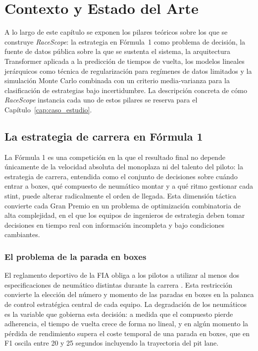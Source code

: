 
\chapter{Contexto y Estado del Arte}
\label{cap:estado_arte}

A lo largo de este capítulo se exponen los pilares teóricos sobre los que se construye \textit{RaceScope}: la estrategia en Fórmula~1 como problema de decisión, la fuente de datos pública sobre la que se sustenta el sistema, la arquitectura Transformer aplicada a la predicción de tiempos de vuelta, los modelos lineales jerárquicos como técnica de regularización para regímenes de datos limitados y la simulación Monte Carlo combinada con un criterio media-varianza para la clasificación de estrategias bajo incertidumbre. La descripción concreta de cómo \textit{RaceScope} instancia cada uno de estos pilares se reserva para el Capítulo~\ref{cap:caso_estudio}.

\section{La estrategia de carrera en Fórmula 1}
\label{sec:estrategia_f1}

La Fórmula 1 es una competición en la que el resultado final no depende únicamente de la velocidad absoluta del monoplaza ni del talento del piloto: la estrategia de carrera, entendida como el conjunto de decisiones sobre cuándo entrar a boxes, qué compuesto de neumático montar y a qué ritmo gestionar cada stint, puede alterar radicalmente el orden de llegada. Esta dimensión táctica convierte cada Gran Premio en un problema de optimización combinatoria de alta complejidad, en el que los equipos de ingenieros de estrategia deben tomar decisiones en tiempo real con información incompleta y bajo condiciones cambiantes.

\subsection{El problema de la parada en boxes}
\label{subsec:pit_stop}

El reglamento deportivo de la FIA obliga a los pilotos a utilizar al menos dos especificaciones de neumático distintas durante la carrera \cite[Art.~B6.3.6]{fia2026sporting}. Esta restricción convierte la elección del número y momento de las paradas en boxes en la palanca de control estratégica central de cada equipo. La degradación de los neumáticos es la variable que gobierna esta decisión: a medida que el compuesto pierde adherencia, el tiempo de vuelta crece de forma no lineal, y en algún momento la pérdida de rendimiento supera el coste temporal de una parada en boxes, que en F1 oscila entre 20 y 25 segundos incluyendo la trayectoria del pit lane.

